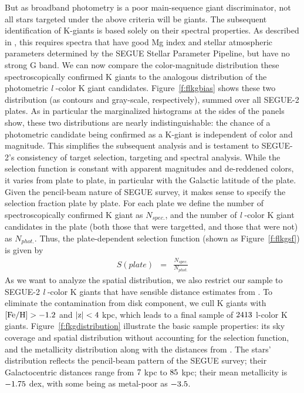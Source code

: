 \documentclass[12pt,preprint]{aastex}
\newcommand{\feh}{{\rm [Fe/H]}}
\begin{document}
But as broadband photometry is a poor main-sequence giant discriminator, not all stars targeted under the above criteria will be giants. The subsequent identification of K-giants is based solely on their spectral properties. As described in \citet{Xue2014}, this requires spectra that have good Mg index and stellar atmospheric parameters determined by the SEGUE Stellar Parameter Pipeline\citep[SSPP;][]{Lee2008a,Lee2008b,Lee2011}, but have no strong G band.
We can now compare the color-magnitude distribution these spectroscopically confirmed K giants
to the analogous distribution of the photometric \textit{l} -color K giant candidates.
Figure~\ref{f:flkgbias} shows these two distribution (as contours and gray-scale, respectively), summed over all SEGUE-2 plates. As in particular the marginalized histograms at the sides of the panels show, these two distributions are nearly indistinguishable: the chance of a photometric candidate being confirmed as a K-giant is independent of color and magnitude. This simplifies the subsequent analysis and is testament to SEGUE-2's consistency of target selection, targeting and spectral analysis.
While the selection function is constant with apparent magnitudes and de-reddened colors, it varies from plate to plate, in particular with the Galactic latitude of the plate. Given the pencil-beam nature of SEGUE survey, it makes sense to specify the selection fraction plate by plate.
For each plate we define the number of spectroscopically confirmed K giant as $N_{spec.}$, and the number of \textit{l} -color K giant candidates in the plate (both those that were targetted, and those that were not) as $N_{phot.}$. Thus, the plate-dependent selection function (shown as Figure~\ref{f:flkgsf}) is given by
\begin{eqnarray}
S(plate) &=& \frac{N_{spec.}}{N_{phot.}}
\end{eqnarray}
As we want to analyze the spatial distribution, we also restrict our sample to SEGUE-2
\textit{l} -color K giants that have sensible distance estimates from \citet{Xue2014}. To eliminate the contamination from disk
component, we cull K giants with $\rm \feh>-1.2$ and $\rm |z|<4~$kpc, which leads to a final sample of $\rm 2413$
l-color K giants. Figure~\ref{f:fkgdistribution} illustrate the basic sample properties: its sky coverage and spatial
distribution without accounting for the selection function, and the metallicity distribution along with the distances
from \citet{Xue2014}. The stars' distribution reflects the pencil-beam pattern of the SEGUE survey; their Galactocentric
distances range from $\rm 7~$kpc to $\rm 85~$kpc; their mean metallicity is $\rm -1.75~$dex, with some being
as metal-poor as $\rm -3.5$.
\end{document}
